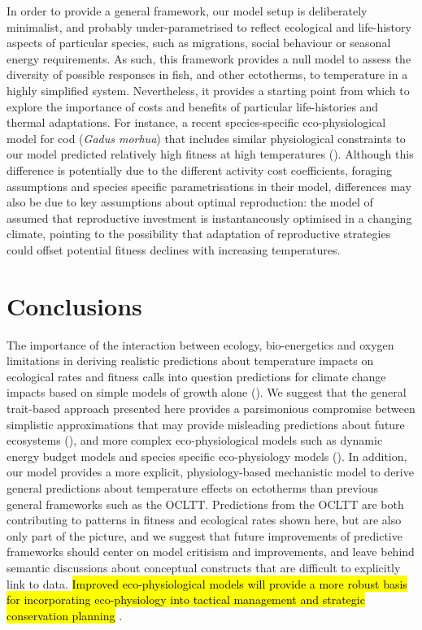\documentclass[11pt]{article}\usepackage[]{graphicx}\usepackage[]{color,soul}
\begin{document}
In order to provide a general framework, our model setup is deliberately minimalist, and probably under-parametrised to reflect ecological and life-history aspects of particular species, such as migrations, social behaviour or seasonal energy requirements. As such, this framework provides a null model to assess the diversity of possible responses in fish, and other ectotherms, to temperature in a highly simplified system. Nevertheless, it provides a starting point from which to explore the importance of costs and benefits of particular life-histories and thermal adaptations. For instance, a recent species-specific eco-physiological model for cod (\emph{Gadus morhua}) that includes similar physiological constraints to our model predicted relatively high fitness at high temperatures (\citealt{holt_climate_2014,holt_climate_2015}). Although this difference is potentially due to the different activity cost coefficients, foraging assumptions and species specific parametrisations in their model, differences may also be due to key assumptions about optimal reproduction: the model of  \citet{holt_climate_2014} assumed that reproductive investment is instantaneously optimised in a changing climate, pointing to the possibility that adaptation of reproductive strategies could offset potential fitness declines with increasing temperatures.

\section*{Conclusions}

The importance of the interaction between ecology, bio-energetics and oxygen limitations in deriving realistic predictions about temperature impacts on ecological rates and fitness calls into question predictions for climate change impacts based on simple models of growth alone (\citealt{cheung_shrinking_2013, pauly_sound_2017}). We suggest that the general trait-based approach presented here provides a parsimonious compromise between simplistic approximations that may provide misleading predictions about future ecosystems (\citealt{brander_overconfidence_2013, lefevre_models_2017}), and more complex eco-physiological models such as dynamic energy budget models \cite[e.g., ][]{guiet_effects_2016} and species specific eco-physiology models (\citealt{hufnagl_physiological_2011, holt_climate_2014,holt_climate_2015}). In addition, our model provides a more explicit, physiology-based mechanistic model to derive general predictions about temperature effects on ectotherms than previous general frameworks such as the OCLTT. Predictions from the OCLTT are both contributing to patterns in fitness and ecological rates shown here, but are also only part of the picture, and we suggest that future improvements of predictive frameworks should center on model critisism and improvements, and leave behind semantic discussions about conceptual constructs that are difficult to explicitly link to data. \hl{Improved eco-physiological models will provide a more robust basis for incorporating eco-physiology into tactical management and strategic conservation planning} \cite{mckenzieconservation2016, pattersonperspective2016}.
\end{document}
